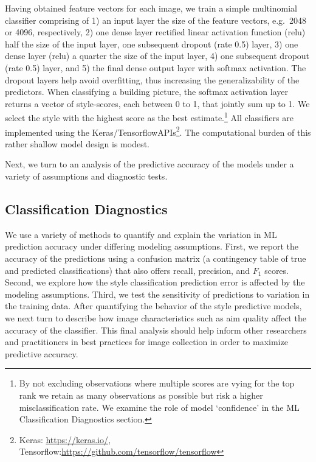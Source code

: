 \documentclass[]{article}
\begin{document}
Having obtained feature vectors for each image, we train a simple multinomial classifier comprising of 1) an input layer the size of the feature vectors, e.g.~2048 or 4096, respectively, 2) one dense layer rectified linear activation function (relu) half the size of the input layer, one subsequent dropout (rate 0.5) layer, 3)   one dense layer (relu) a quarter the size of the input layer, 4) one subsequent dropout (rate 0.5) layer, and 5) the final dense output layer with softmax activation. The dropout layers help avoid overfitting, thus increasing the generalizability of the predictors. When classifying a building picture, the softmax activation layer returns a vector of style-scores, each between 0 to 1, that jointly sum up to 1. We select the style with the highest score as the best estimate.\footnote{By not excluding observations where multiple scores are vying for the top rank we retain as many observations as possible but risk a higher misclassification rate. We examine the role of model `confidence' in the ML Classification Diagnostics section.} All classifiers are implemented using the Keras/TensorflowAPIs\footnote{Keras: \href{https://keras.io/}{https://keras.io/}, Tensorflow:\href{https://github.com/tensorflow/tensorflow}{https://github.com/tensorflow/tensorflow}}. The computational burden of this rather shallow model design is modest.

Next, we turn to an analysis of the predictive accuracy of the models under a variety of assumptions and diagnostic tests.

\hypertarget{style-classification-diagnostics}{%
\subsection{Classification Diagnostics}\label{style-classification-diagnostics}}

We use a variety of methods to quantify and explain the variation in ML prediction accuracy under differing modeling assumptions. First, we report the accuracy of the  predictions using a confusion matrix (a contingency table of true and predicted classifications) that also offers recall, precision, and $F_{1}$ scores. Second, we explore how the style classification prediction error is affected by the modeling assumptions. Third, we test the sensitivity of predictions to variation in the training data. After quantifying the behavior of the style predictive models, we next turn to describe how image characteristics such as aim quality affect the accuracy of the classifier. This final analysis should help inform other researchers and practitioners in best practices for image collection in order to maximize predictive accuracy.
\end{document}
